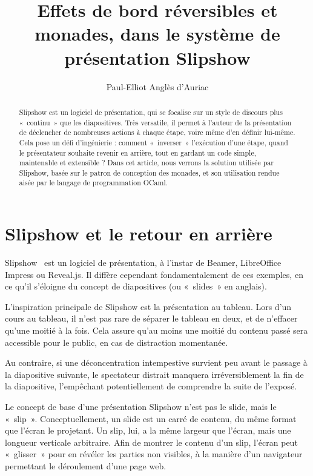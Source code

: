 \documentclass[final]{jflart}
\title{Effets de bord réversibles et monades, dans le système de présentation Slipshow}
\author{Paul-Elliot Anglès d'Auriac}
\begin{document}
\maketitle

\begin{abstract}
  Slipshow est un logiciel de présentation, qui se focalise sur un style de
  discours plus «~continu~» que les diapositives. Très versatile, il permet à
  l'auteur de la présentation de déclencher de nombreuses actions à chaque
  étape, voire même d'en définir lui-même. Cela pose un défi d'ingénierie :
  comment «~inverser~» l'exécution d'une étape, quand le présentateur souhaite
  revenir en arrière, tout en gardant un code simple, maintenable et extensible
  ? Dans cet article, nous verrons la solution utilisée par Slipshow, basée sur
  le patron de conception des monades, et son utilisation rendue aisée par le
  langage de programmation OCaml.
\end{abstract}

\section{Slipshow et le retour en arrière}

Slipshow~\cite{slipshow} est un logiciel de présentation, à l'instar de Beamer, LibreOffice
Impress ou Reveal.js. Il diffère cependant fondamentalement de ces
exemples, en ce qu'il s'éloigne du concept de diapositives (ou «~slides~» en
anglais).

L'inspiration principale de Slipshow est la présentation au tableau. Lors d'un
cours au tableau, il n'est pas rare de séparer le tableau en deux, et de
n'effacer qu'une moitié à la fois. Cela assure qu'au moins une moitié du contenu
passé sera accessible pour le public, en cas de distraction momentanée.

Au contraire, si une déconcentration intempestive survient peu avant le passage à la
diapositive suivante, le spectateur distrait manquera irréversiblement la fin de
la diapositive, l'empêchant potentiellement de comprendre la suite de l'exposé.

Le concept de base d'une présentation Slipshow n'est pas le slide, mais le
«~slip~». Conceptuellement, un slide est un carré de contenu, du même format que
l'écran le projetant. Un slip, lui, a la même largeur que l'écran, mais une
longueur verticale arbitraire. Afin de montrer le contenu d'un slip, l'écran
peut «~glisser~» pour en révéler les parties non visibles, à la manière d'un
navigateur permettant le déroulement d'une page web.
\end{document}
